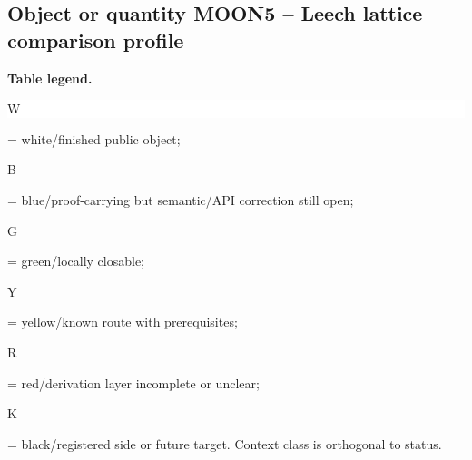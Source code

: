\subsection*{Object or quantity MOON5 -- Leech lattice comparison profile}
\hypertarget{objproof:MOON5}{}
\par\smallskip\noindent\begin{minipage}{0.99\linewidth}\footnotesize\raggedright\textbf{Table legend.} \colorbox{white}{\strut W} = white/finished public object; \colorbox{cyan!20}{\strut B} = blue/proof-carrying but semantic/API correction still open; \colorbox{green!18}{\strut G} = green/locally closable; \colorbox{yellow!25}{\strut Y} = yellow/known route with prerequisites; \colorbox{red!20}{\strut R} = red/derivation layer incomplete or unclear; \colorbox{black!18}{\strut K} = black/registered side or future target. Context class is orthogonal to status.\end{minipage}\par\vspace{0.25em}

